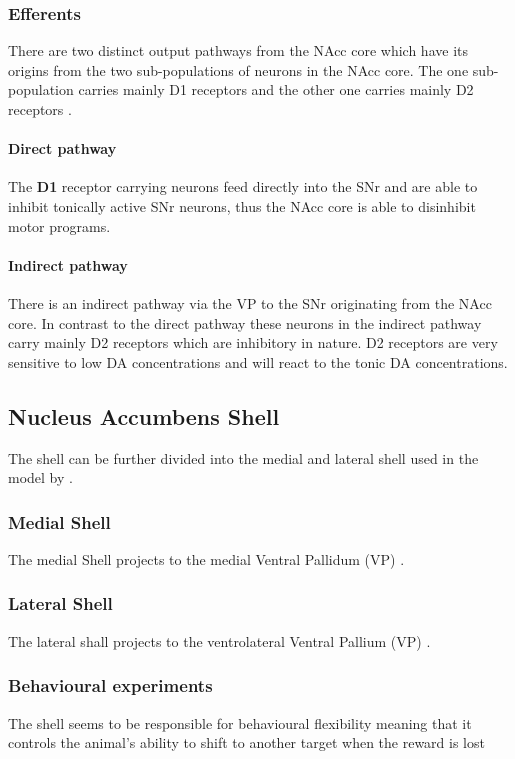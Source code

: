 \documentclass[12pt,a4paper]{article}
\begin{document}
\subsubsection{Efferents}
There are two distinct output pathways from the NAcc core which have
its origins from the two sub-populations of neurons in the NAcc
core. The one sub-population carries mainly D1 receptors and the other
one carries mainly D2 receptors \citep{kelley04,Humphries2010}.

\paragraph{Direct pathway}
The \textbf{D1} receptor carrying neurons feed directly into the SNr and are
able to inhibit tonically active SNr neurons, thus the NAcc core is
able to disinhibit motor programs.

\paragraph{Indirect pathway}
There is an indirect pathway via the VP to the SNr originating from
the NAcc core. In contrast to the direct pathway these neurons in the
indirect pathway carry mainly D2 receptors which are inhibitory in
nature. D2 receptors are very sensitive to low DA concentrations and
will react to the tonic DA concentrations.




\subsection{Nucleus Accumbens Shell\label{shell}}
The shell can be further divided into the medial and lateral shell
\citep{Ikemoto2007,Usuda1998} used in the model by
\citep{Humphries2010}.

\subsubsection{Medial Shell}
The medial Shell projects to the medial Ventral Pallidum (VP)
\citep{Ikemoto2007}.

\subsubsection{Lateral Shell}
The lateral shall projects to the ventrolateral Ventral Pallium (VP)
\citep{Ikemoto2007}.


\subsubsection{Behavioural experiments}
The shell seems to be responsible for behavioural flexibility meaning
that it controls the animal's ability to shift to another target when
the reward is lost \citep{Aquili2014}
\end{document}
